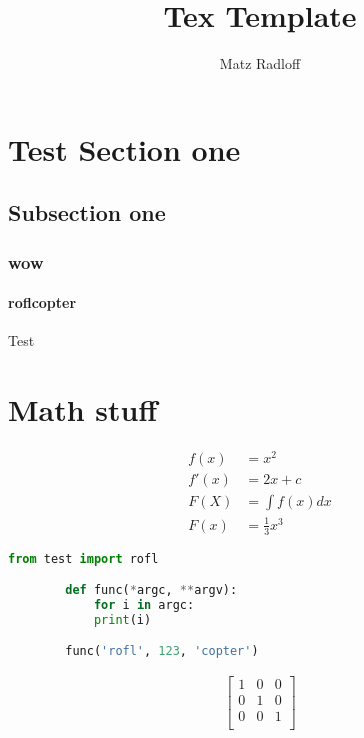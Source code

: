 \documentclass{article}
\title{\textbf{Tex Template}}
\author{Matz Radloff}
\begin{document}
\maketitle
\date{}

\section{Test Section one}
\subsection{Subsection one}
\subsubsection{wow}
\paragraph{roflcopter}
Test

\section{Math stuff}

    \begin{align}
    f(x) &= x^2\\
    f'(x) &= 2x+c\\
    F(X) &= \int f(x)dx\\
    F(x) &= \frac{1}{3}x^3
    \end{align}

    \begin{lstlisting}[language={Python},caption=Python test]
        from test import rofl

        def func(*argc, **argv):
            for i in argc:
            print(i)

        func('rofl', 123, 'copter')
    \end{lstlisting}

    \begin{align}
    \left[
    \begin{matrix}
    1 & 0 & 0\\
    0 & 1 & 0\\
    0 & 0 & 1\\
    \end{matrix}
    \right]
    \end{align}
\end{document}
